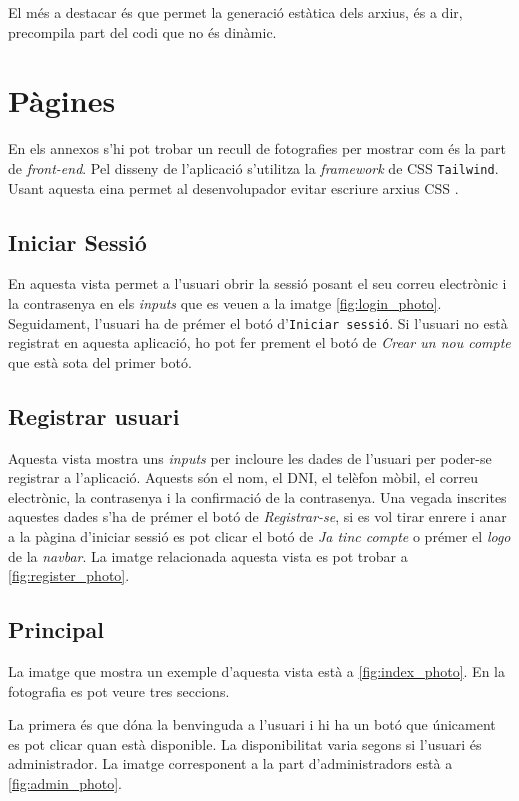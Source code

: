 El més a destacar és que permet la generació estàtica dels arxius, és a dir, precompila part
del codi que no és dinàmic.

\section{Pàgines}
En els annexos s'hi pot trobar un recull de fotografies per mostrar com és la part de \emph{front-end}.
Pel disseny de l'aplicació s'utilitza la \emph{framework} de CSS \texttt{Tailwind}. Usant
aquesta eina permet al desenvolupador evitar escriure arxius CSS \autocite{tailwind}.

\subsection{Iniciar Sessió}
En aquesta vista permet a l'usuari obrir la sessió posant el seu correu electrònic i la contrasenya
en els \emph{inputs} que es veuen a la imatge \autoref{fig:login_photo}. Seguidament, l'usuari ha
de prémer el botó d'\texttt{Iniciar sessió}. Si l'usuari no està registrat en aquesta aplicació, ho
 pot fer prement el botó de \emph{Crear un nou compte} que està sota del primer botó.

\subsection{Registrar usuari}
Aquesta vista mostra uns \emph{inputs} per incloure les dades de l'usuari per
poder-se registrar a l'aplicació. Aquests són el nom, el DNI, el telèfon mòbil, el correu electrònic, la contrasenya
i la confirmació de la contrasenya. Una vegada inscrites aquestes dades s'ha de prémer el botó de \emph{Registrar-se},
si es vol tirar enrere i anar a la pàgina d'iniciar sessió es pot clicar el botó de \emph{Ja tinc compte} o prémer el \emph{logo} de
la \emph{navbar}. La imatge relacionada aquesta vista es pot trobar a \autoref{fig:register_photo}.

\subsection{Principal}
La imatge que mostra un exemple d'aquesta vista està a \autoref{fig:index_photo}. En la fotografia es pot veure tres seccions.

La primera és que dóna la benvinguda a l'usuari i hi ha un botó que únicament es pot clicar quan està disponible.
La disponibilitat varia segons si l'usuari és administrador. La imatge corresponent a la part d'administradors
està a \autoref{fig:admin_photo}.

